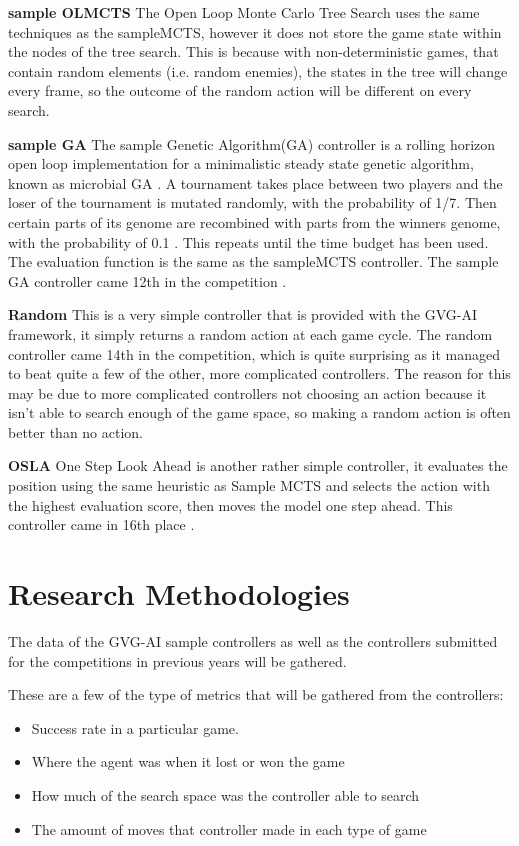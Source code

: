 \documentclass[journal]{IEEEtran}
\begin{document}
		\textbf{sample OLMCTS} \label{sssec:sampleOLMCTS}
			The Open Loop Monte Carlo Tree Search uses the same techniques as the sampleMCTS, however it does not store the game state within the nodes of the tree search. 
			This is because with non-deterministic games, that contain random elements (i.e. random enemies), the states in the tree will change every frame, so the outcome of the random action will be different on every search.
			

		\textbf{sample GA} \label{sssec:sampleGA}
			The sample Genetic Algorithm(GA) controller is a rolling horizon open loop implementation for a minimalistic steady state genetic algorithm, known as microbial GA \cite{harvey2009microbial, perez20162014}.
			A tournament takes place between two players and the loser of the tournament is mutated randomly, with the probability of 1/7. Then certain parts of its genome are recombined with parts from the winners genome, with the probability of 0.1 \cite{perez20162014}. 
			This repeats until the time budget has been used. The evaluation function is the same as the sampleMCTS controller. 
			The sample GA controller came 12th in the competition \cite{perez20162014}.
			

		\textbf{Random}
			This is a very simple controller that is provided with the GVG-AI framework, it simply returns a random action at each game cycle.
			The random controller came 14th in the competition, which is quite surprising as it managed to beat quite a few of the other, more complicated controllers. 
			The reason for this may be due to more complicated controllers not choosing an action because it isn't able to search enough of the game space, so making a random action is often better than no action.

		\textbf{OSLA}
			One Step Look Ahead is another rather simple controller, it evaluates the position using the same heuristic as Sample MCTS and selects the action with the highest evaluation score, then moves the model one step ahead. This controller came in 16th place \cite{perez20162014}.

	
		
	
\section{Research Methodologies}	
	The data of the GVG-AI sample controllers as well as the controllers submitted for the competitions in previous years will be gathered. 

	These are a few of the type of metrics that will be gathered from the controllers:
	\begin{itemize}
		\item Success rate in a particular game.
		\item Where the agent was when it lost or won the game
		\item How much of the search space was the controller able to search
		\item The amount of moves that controller made in each type of game
	\end{itemize}
\end{document}
